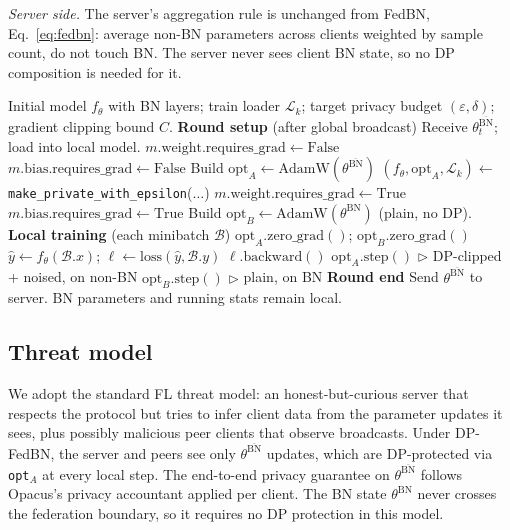 \documentclass[conference]{IEEEtran}
\newcommand{\code}[1]{\texttt{\small #1}}
\begin{document}
\emph{Server side.} The server's aggregation rule is unchanged from FedBN, Eq.~\eqref{eq:fedbn}: average non-BN parameters across clients weighted by sample count, do not touch BN. The server never sees client BN state, so no DP composition is needed for it.

\begin{algorithm}[t]
\caption{DP-FedBN: client-side setup and one round}
\label{alg:dpfedbn}
\footnotesize
\begin{algorithmic}[1]
\REQUIRE Initial model $f_\theta$ with BN layers; train loader $\mathcal{L}_k$; target privacy budget $(\varepsilon,\delta)$; gradient clipping bound $C$.
\STATE \textbf{Round setup} (after global broadcast)
\STATE Receive $\theta_t^{\overline{\mathrm{BN}}}$; load into local model.
  \STATE $m.\text{weight.requires\_grad} \leftarrow \text{False}$
  \STATE $m.\text{bias.requires\_grad} \leftarrow \text{False}$
\ENDFOR
\STATE Build $\text{opt}_A \leftarrow \mathrm{AdamW}(\theta^{\overline{\mathrm{BN}}})$
\STATE $(f_\theta, \text{opt}_A, \mathcal{L}_k) \leftarrow$ \code{make\_private\_with\_epsilon}($\dots$)
  \STATE $m.\text{weight.requires\_grad} \leftarrow \text{True}$
  \STATE $m.\text{bias.requires\_grad} \leftarrow \text{True}$
\ENDFOR
\STATE Build $\text{opt}_B \leftarrow \mathrm{AdamW}(\theta^{\mathrm{BN}})$ (plain, no DP).
\STATE \textbf{Local training} (each minibatch $\mathcal{B}$)
\STATE $\text{opt}_A.\text{zero\_grad}()$; $\text{opt}_B.\text{zero\_grad}()$
\STATE $\hat{y} \leftarrow f_\theta(\mathcal{B}.x)$; $\ell \leftarrow \text{loss}(\hat{y}, \mathcal{B}.y)$
\STATE $\ell.\text{backward}()$
\STATE $\text{opt}_A.\text{step}()$ \quad $\triangleright$ DP-clipped + noised, on non-BN
\STATE $\text{opt}_B.\text{step}()$ \quad $\triangleright$ plain, on BN
\STATE \textbf{Round end}
\STATE Send $\theta^{\overline{\mathrm{BN}}}$ to server.
\STATE BN parameters and running stats remain local.
\end{algorithmic}
\end{algorithm}

\subsection{Threat model}
We adopt the standard FL threat model: an honest-but-curious server that respects the protocol but tries to infer client data from the parameter updates it sees, plus possibly malicious peer clients that observe broadcasts. Under DP-FedBN, the server and peers see only $\theta^{\overline{\mathrm{BN}}}$ updates, which are DP-protected via \code{opt$_A$} at every local step. The end-to-end privacy guarantee on $\theta^{\overline{\mathrm{BN}}}$ follows Opacus's privacy accountant applied per client. The BN state $\theta^{\mathrm{BN}}$ never crosses the federation boundary, so it requires no DP protection in this model.
\end{document}
